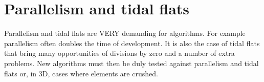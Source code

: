 \section{Parallelism and tidal flats}

Parallelism and tidal flats are VERY demanding for algorithms. For example
parallelism often doubles the time of development. It is also the case of tidal
flats that bring many opportunities of divisions by zero and a number of extra
problems. New algorithms must then be duly tested against parallelism and tidal
flats or, in 3D, cases where elements are crushed.
% 
